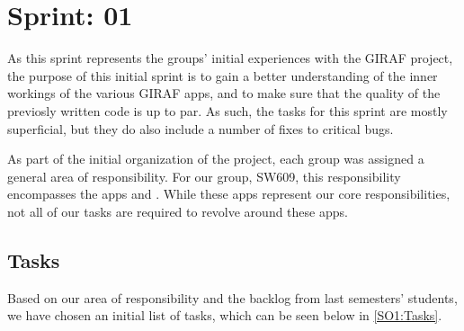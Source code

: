 \chapter{Sprint: 01}
As this sprint represents the groups' initial experiences with the GIRAF
project, the purpose of this initial sprint is to gain a better understanding of
the inner workings of the various GIRAF apps, and to make sure that the quality
of the previosly written code is up to par. As such, the tasks for this sprint
are mostly superficial, but they do also include a number of fixes to critical
bugs.\nl

As part of the initial organization of the project, each group was assigned a
general area of responsibility. For our group, SW609, this responsibility
encompasses the apps  and . While
these apps represent our core responsibilities, not all of our tasks are
required to revolve around these apps.

\section{Tasks}
Based on our area of responsibility and the backlog from last semesters'
students, we have chosen an initial list of tasks, which can be seen below in
\autoref{SO1:Tasks}. 

